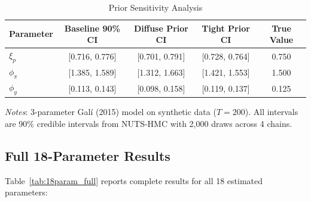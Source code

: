 \documentclass[12pt]{article}
\theoremstyle{plain}
\theoremstyle{definition}
\theoremstyle{remark}
\begin{document}
\begin{table}[htbp]
\centering
\caption{Prior Sensitivity Analysis}
\label{tab:prior_sensitivity}
\begin{tabular}{lcccc}
\toprule
Parameter & Baseline 90\% CI & Diffuse Prior CI & Tight Prior CI & True Value \\
\midrule
$\xi_p$ & [0.716, 0.776] & [0.701, 0.791] & [0.728, 0.764] & 0.750 \\
$\phi_\pi$ & [1.385, 1.589] & [1.312, 1.663] & [1.421, 1.553] & 1.500 \\
$\phi_y$ & [0.113, 0.143] & [0.098, 0.158] & [0.119, 0.137] & 0.125 \\
\bottomrule
\end{tabular}
\smallskip
{\footnotesize \textit{Notes}: 3-parameter Gal\'i (2015) model on synthetic data ($T=200$). All intervals are 90\% credible intervals from NUTS-HMC with 2,000 draws across 4 chains.}
\end{table}


\subsection{Full 18-Parameter Results}

Table~\ref{tab:18param_full} reports complete results for all 18 estimated parameters:
\end{document}
